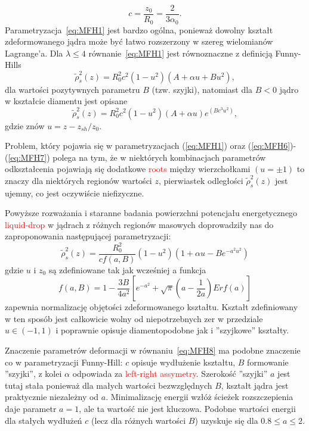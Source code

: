 \documentclass[polish]{article}
\numberwithin{equation}{section}
\begin{document}
\begin{equation} \label{eq:MFH5}
c=\frac{z_{0}}{R_{0}}=\frac{2}{3\alpha_{0}}.
\end{equation}
Parametryzacja~\ref{eq:MFH1} jest bardzo ogólna, ponieważ dowolny kształt zdeformowanego jądra może być łatwo rozszerzony w szereg wielomianów Lagrange'a. Dla $\lambda\leq4$ równanie~\ref{eq:MFH1} jest równoznaczne z definicją Funny-Hills
\begin{equation} \label{eq:MFH6}
\tilde{\rho}^{2}_{s}(z)=R_{0}^{2}c^{2}(1-u^{2})(A+\alpha u+Bu^{2}),
\end{equation}
dla wartości pozytywnych parametru $B$ (tzw. szyjki), natomiast dla $B<0$ jądro w kształcie diamentu jest opisane
\begin{equation} \label{eq:MFH7}
\tilde{\rho}^{2}_{s}(z)=R_{0}^{2}c^{2}(1-u^{2})(A+\alpha u)e^{(Bc^{3}u^{2})},
\end{equation}
gdzie znów $u=z-z_{sh}/z_{0}$.

Problem, który pojawia się w parametryzacjach (\ref{eq:MFH1}) oraz (\ref{eq:MFH6})-(\ref{eq:MFH7}) polega na tym, że w niektórych kombinacjach parametrów odkształcenia pojawiają się dodatkowe \textcolor{red}{roots} między wierzchołkami $(u=\pm1)$ to znaczy dla niektórych regionów wartości $z$, pierwiastek odległości $\tilde{\rho}^{2}_{s}(z)$ jest ujemny, co jest oczywiście niefizyczne.

Powyższe rozważania i staranne badania powierzchni potencjału energetycznego \textcolor{red}{liquid-drop} w jądrach z różnych regionów masowych doprowadziły nas do zaproponowania następującej parametryzacji:
\begin{equation} \label{eq:MFH8}
\tilde{\rho}^{2}_{s}(z)=\frac{R_{0}^{2}}{c f(a,B)}(1-u^{2})(1+\alpha u-Be^{-a^{2}u^{2}})
\end{equation}
gdzie $u$ i $z_{0}$ są zdefiniowane tak jak wcześniej a funkcja
\begin{equation} \label{eq:MFH9}
f(a,B)=1-\frac{3B}{4a^{2}}\left[e^{-a^{2}}+\sqrt{\pi}(a-\frac{1}{2a})Erf(a)\right]
\end{equation}
zapewnia normalizację objętości zdeformowanego kształtu. Kształt zdefiniowany w ten sposób jest całkowicie wolny od niepotrzebnych zer w przedziale $u\in (-1,1)$ i poprawnie opisuje diamentopodobne jak i ''szyjkowe'' kształty.

Znaczenie parametrów deformacji w równaniu~\ref{eq:MFH8} ma podobne znaczenie co w parametryzacji Funny-Hill: $c$ opisuje wydłużenie kształtu, $B$ formowanie ''szyjki'', z kolei $\alpha$ odpowiada za \textcolor{red}{left-right assymetry}. Szerokość ''szyjki'' $a$ jest tutaj stała ponieważ dla małych wartości bezwzględnych $B$, kształt jądra jest praktycznie niezależny od $a$. Minimalizację energii wzłóż ścieżek rozszczepienia daje parametr $a=1$, ale ta wartość nie jest kluczowa. Podobne wartości energii dla stałych wydłużeń $c$ (lecz dla różnych wartości $B$) uzyskuje się dla $0.8\leq a \leq 2$.
\end{document}
